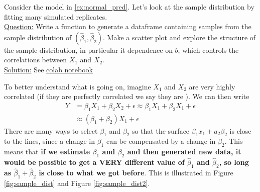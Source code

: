 \begin{example}

Consider the model in \ref{ex:normal_pred}. Let's look at the sample distribution by fitting many simulated replicates. \\

\noindent
\underline{Question:} Write a function to generate a dataframe containing samples from the sample distribution of $(\hat{\beta}_1,\hat{\beta}_2)$. Make a scatter plot and explore the structure of the sample distribution, in particular it dependence on $b$, which controls the correlations between $X_1$ and $X_2$. \\


\noindent
\underline{Solution:} 
See \href{https://colab.research.google.com/drive/1oIRgP_7-c5DGV1D2iz5nj406mZfJxUIG?usp=sharing}{colab notebook}

\end{example}

To better understand what is going on, imagine $X_1$ and $X_2$ are very highly correlated (if they are perfectly correlated we say they are ). We can then write 
\begin{align*}
Y &= \beta_1X_1 + \beta_2X_2 + \epsilon  \approx \beta_1X_1 + \beta_2X_1 + \epsilon\\
 &\approx (\beta_1+\beta_2)X_1 + \epsilon
\end{align*}
There are many ways to select $\beta_1$ and $\beta_2$ so that the surface $\beta_1x_1+a_2\beta_2$ is close to the lines, since a change in $\beta_1$ can be compensated by a change in $\beta_2$. This means that {\bf if we estimate $\beta_1$ and $\beta_2$ and then generated new data, it would be possible to get a VERY different value of $\hat{\beta}_1$ and $\hat{\beta}_2$, so long as $\hat{\beta}_1 + \hat{\beta}_2$ is close to what we got before}. This is illustrated in Figure \ref{fig:sample_dist} and Figure \ref{fig:sample_dist2}. 

